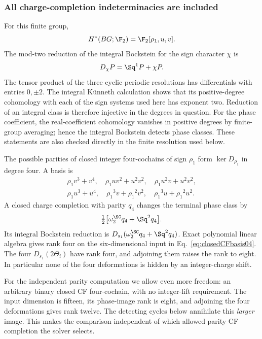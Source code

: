 \subsubsection{All charge-completion indeterminacies are included}
For this finite group,
\begin{equation}
H^*(BG;\F_2)=\F_2[{\rho_1},u,v].
\end{equation}
The mod-two reduction of the integral Bockstein for the sign character $\chi$ is
\begin{equation}\label{eq:twBock04}
D_\chi P=\Sq^1P+\chi P.
\end{equation}
The tensor product of the three cyclic periodic resolutions has differentials with entries $0,\pm2$. The integral K\"unneth calculation shows that its positive-degree cohomology with each of the sign systems used here has exponent two. Reduction of an integral class is therefore injective in the degrees in question. For the phase coefficient, the real-coefficient cohomology vanishes in positive degrees by finite-group averaging; hence the integral Bockstein detects phase classes. These statements are also checked directly in the finite resolution used below.

The possible parities of closed integer four-cochains of sign ${\rho_1}$ form $\ker D_{\rho_1}$ in degree four. A basis is
\begin{equation}\label{eq:closedCFbasis04}
\begin{gathered}
{\rho_1}v^3+v^4,\quad {\rho_1}uv^2+u^2v^2,\quad {\rho_1}u^2v+u^2v^2,\\
{\rho_1}u^3+u^4,\quad {\rho_1}^3v+{\rho_1}^2v^2,\quad {\rho_1}^3u+{\rho_1}^2u^2.
\end{gathered}
\end{equation}
A closed charge completion with parity $q_4$ changes the terminal phase class by
\begin{equation}\label{eq:CFimage04}
\tfrac12\bigl[\omega_2^{\SC}q_4+\Sq^2q_4\bigr].
\end{equation}
Its integral Bockstein reduction is $D_{s_1}(\omega_2^{\SC}q_4+\Sq^2q_4)$. Exact polynomial linear algebra gives rank four on the six-dimensional input in Eq.~\eqref{eq:closedCFbasis04}. The four $D_{s_1}(2\Theta_i)$ have rank four, and adjoining them raises the rank to eight. In particular none of the four deformations is hidden by an integer-charge shift.

For the independent parity computation we allow even more freedom: an arbitrary binary closed CF four-cochain, with no integer-lift requirement. The input dimension is fifteen, its phase-image rank is eight, and adjoining the four deformations gives rank twelve. The detecting cycles below annihilate this \emph{larger} image. This makes the comparison independent of which allowed parity CF completion the solver selects.


